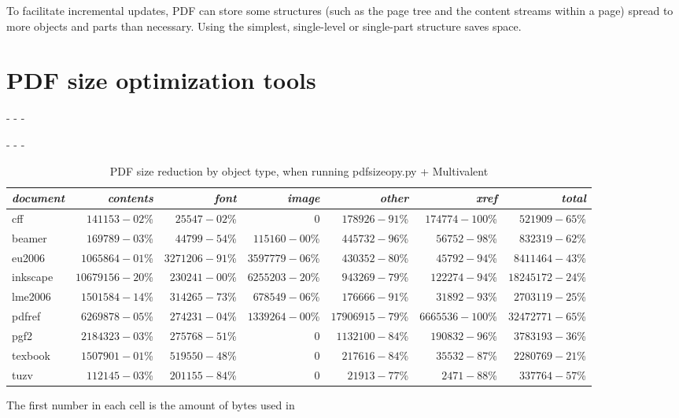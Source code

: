 \documentclass{ltugproc}
\def\cmd{\textsf}
\def\captiontop#1{%
  \advance\abovecaptionskip-\belowcaptionskip
  \advance\belowcaptionskip\abovecaptionskip
  \advance\abovecaptionskip-\belowcaptionskip
  \abovecaptionskip-\abovecaptionskip
  \caption{#1}%
  \advance\abovecaptionskip-\belowcaptionskip
  \advance\belowcaptionskip\abovecaptionskip
  \advance\abovecaptionskip-\belowcaptionskip
  \abovecaptionskip-\abovecaptionskip
}
\begin{document}
To facilitate incremental updates, PDF can store some structures (such as
the page tree and the content streams within a page) spread to more objects
and parts than necessary. Using the simplest, single-level or single-part
structure saves space.




\section{PDF size optimization tools}\label{tools}

\begin{table*}
\captiontop{PDF size reduction by object type, when running
\cmd{pdfsizeopy.py} + Multivalent}\label{tab:psom-by-type}
\advance\tabcolsep-2.2pt  %
\par\small\noindent\hfil
\begin{tabular*}{\hsize}{@{\extracolsep{\fill}}lrrrrrr@{}}
\toprule
\emph{document} & \emph{contents} & \emph{font} & \emph{image} & \emph{other} & \emph{xref} & \emph{total} \\\midrule
cff & $141153-02$\% & $25547-02$\% & 0 & $178926-91$\% & $174774-100$\% & $521909-65$\% \\
beamer & $169789-03$\% & $44799-54$\% & $115160-00$\% & $445732-96$\% & $56752-98$\% & $832319-62$\% \\
eu2006 & $1065864-01$\% & $3271206-91$\% & $3597779-06$\% & $430352-80$\% & $45792-94$\% & $8411464-43$\% \\
inkscape & $10679156-20$\% & $230241-00$\% & $6255203-20$\% & $943269-79$\% & $122274-94$\% & $18245172-24$\% \\
lme2006 & $1501584-14$\% & $314265-73$\% & $678549-06$\% & $176666-91$\% & $31892-93$\% & $2703119-25$\% \\
pdfref & $6269878-05$\% & $274231-04$\% & $1339264-00$\% & $17906915-79$\% & $6665536-100$\% & $32472771-65$\% \\
pgf2 & $2184323-03$\% & $275768-51$\% & 0 & $1132100-84$\% & $190832-96$\% & $3783193-36$\% \\
texbook & $1507901-01$\% & $519550-48$\% & 0 & $217616-84$\% & $35532-87$\% & $2280769-21$\% \\
tuzv & $112145-03$\% & $201155-84$\% & 0 & $21913-77$\% & $2471-88$\% & $337764-57$\% \\
\bottomrule
\end{tabular*}
\par\bigskip
\par\noindent The first number in each cell is the amount of bytes used in

\end{table*}
\end{document}
